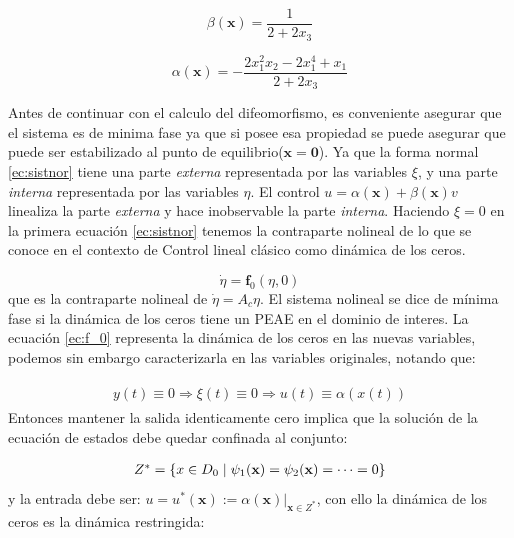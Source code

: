 \documentclass[10pt]{article}
\begin{document}
\begin{equation}
    \beta(\mathbf{x})=\frac{1}{2+2x_{3}}
\end{equation}

\begin{equation}
    \alpha(\mathbf{x}) = -\frac{2x_{1}^{2}x_{2}-2x_{1}^{4}+x_{1}}{2+2x_{3}}
\end{equation}

Antes de continuar con el calculo del difeomorfismo, es conveniente asegurar que el sistema es de minima fase
ya que si posee esa propiedad se puede asegurar que puede ser estabilizado al punto de equilibrio($\mathbf{x}=\mathbf{0}$). 
Ya que la forma normal \eqref{ec:sistnor} tiene una parte \textit{externa} representada por las variables $\xi$, y una parte \textit{interna}
representada por las variables $\eta$. El control $u=\alpha(\mathbf{x})+\beta(\mathbf{x})v$ linealiza la parte \textit{externa} y hace inobservable la parte \textit{interna}. Haciendo $\xi=0$ en la primera ecuación \eqref{ec:sistnor} tenemos la contraparte nolineal de lo que se conoce en el contexto de Control lineal clásico como dinámica de los ceros.

\begin{equation}
    \dot{\eta} = \mathbf{f}_{0}(\eta, 0)
    \label{ec:f_0}
\end{equation}
que es la contraparte nolineal de $\dot{\eta}=A_{c}\eta$. El sistema nolineal se dice de mínima fase si la dinámica de los ceros tiene un PEAE
en el dominio de interes. La ecuación \eqref{ec:f_0}  representa la dinámica de los ceros en las nuevas variables, podemos sin embargo caracterizarla en las variables originales, notando que:

%
\begin{align}
\begin{array}{c}
y(t) \equiv 0 \Rightarrow \xi(t) \equiv 0 \Rightarrow u(t) \equiv \alpha(x(t))
\end{array}
\end{align}
Entonces mantener la salida identicamente cero implica que la solución de la ecuación de estados debe quedar confinada al conjunto:

\begin{align}
\begin{array}{c}
    Z^{*} = \lbrace x \in D_0 \hspace{0.1cm} \vert \hspace{0.1cm} \psi_{1}(\mathbf{x}) = \psi_{2}(\mathbf{x}) = \cdots = 0 \rbrace
\end{array}
\end{align}
%
y la entrada debe ser: $u=u^{*}(\mathbf{x}):= \alpha(\mathbf{x})|_{\mathbf{x}\in Z^{*}}$, con ello la dinámica de los ceros es la dinámica restringida:
\end{document}
